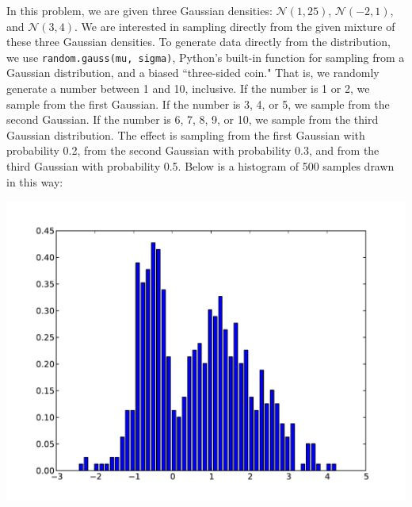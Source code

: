 \documentclass[solution, letterpaper]{cs121}
\begin{document}
\begin{empfile}
\subproblem %
In this problem, we are given three Gaussian densities: $\mathcal{N}(1,25)$, $\mathcal{N}(-2,1)$, and $\mathcal{N}(3,4)$. We are interested in sampling directly from the given mixture of these three Gaussian densities. To generate data directly from the distribution, we use {\tt random.gauss(mu, sigma)}, Python's built-in function for sampling from a Gaussian distribution, and a biased ``three-sided coin." That is, we randomly generate a number between 1 and 10, inclusive. If the number is 1 or 2, we sample from the first Gaussian. If the number is 3, 4, or 5, we sample from the second Gaussian. If the number is 6, 7, 8, 9, or 10, we sample from the third Gaussian distribution. The effect is sampling from the first Gaussian with probability 0.2, from the second Gaussian with probability 0.3, and from the third Gaussian with probability 0.5. Below is a histogram of 500 samples drawn in this way:
\begin{center}
\includegraphics[scale=0.8]{direct-sample-histogram.pdf}
\end{center}

\pagebreak


\end{empfile}
\end{document}
